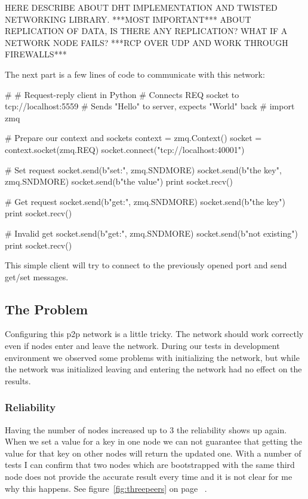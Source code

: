 HERE DESCRIBE ABOUT DHT IMPLEMENTATION AND TWISTED NETWORKING LIBRARY. ***MOST IMPORTANT*** ABOUT REPLICATION OF DATA, IS THERE ANY REPLICATION? WHAT IF A NETWORK NODE FAILS? ***RCP OVER UDP AND WORK THROUGH FIREWALLS***

The next part is a few lines of code to communicate with this network:

\begin{python}
#
# Request-reply client in Python
# Connects REQ socket to tcp://localhost:5559
# Sends "Hello" to server, expects "World" back
#
import zmq

# Prepare our context and sockets
context = zmq.Context()
socket = context.socket(zmq.REQ)
socket.connect("tcp://localhost:40001")

# Set request
socket.send(b"set:", zmq.SNDMORE)
socket.send(b"the key", zmq.SNDMORE)
socket.send(b"the value")
print socket.recv()

# Get request
socket.send(b"get:", zmq.SNDMORE)
socket.send(b"the key")
print socket.recv()

# Invalid get
socket.send(b"get:", zmq.SNDMORE)
socket.send(b"not existing")
print socket.recv()
\end{python}

This simple client will try to connect to the previously opened port and send get/set messages.

\subsection{The Problem}
Configuring this p2p network is a little tricky. The network should work correctly even if nodes enter and leave the network. During our tests in development environment we observed some problems with initializing the network, but while the network was initialized leaving and entering the network had no effect on the results.

\subsubsection{Reliability}
Having the number of nodes increased up to 3 the reliability shows up again. When we set a value for a key in one node we can not guarantee that getting the value for that key on other nodes will return the updated one. With a number of tests I can confirm that two nodes which are bootstrapped with the same third node does not provide the accurate result every time and it is not clear for me why this happens. See figure~\ref{fig:threepeers} on page ~\pageref{fig:threepeers}.

